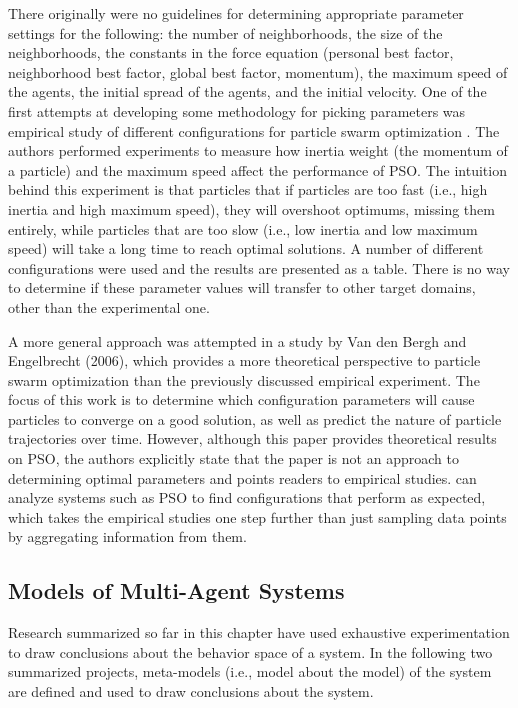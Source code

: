 There originally were no guidelines for determining appropriate parameter settings for the following: the number of neighborhoods, the size of the neighborhoods, the constants in the force equation (personal best factor, neighborhood best factor, global best factor, momentum), the maximum speed of the agents, the initial spread of the agents, and the initial velocity.
One of the first attempts at developing some methodology for picking parameters was empirical study of different configurations for particle swarm optimization \cite{shi1998parameter}.
The authors performed experiments to measure how inertia weight (the momentum of a particle) and the maximum speed affect the performance of PSO.
The intuition behind this experiment is that particles that if particles are too fast (i.e., high inertia and high maximum speed), they will overshoot optimums, missing them entirely, while particles that are too slow (i.e., low inertia and low maximum speed) will take a long time to reach optimal solutions.
A number of different configurations were used and the results are presented as a table.
There is no way to determine if these parameter values will transfer to other target domains, other than the experimental one.

A more general approach was attempted in a study by Van den Bergh and Engelbrecht (2006)\nocite{van2006study}, which provides a more theoretical perspective to particle swarm optimization than the previously discussed empirical experiment.
The focus of this work is to determine which configuration parameters will cause particles to converge on a good solution, as well as predict the nature of particle trajectories over time.
However, although this paper provides theoretical results on PSO, the authors explicitly state that the paper is not an approach to determining optimal parameters and points readers to empirical studies.
\fw can analyze systems such as PSO to find configurations that perform as expected, which takes the empirical studies one step further than just sampling data points by aggregating information from them.

\subsection{Models of Multi-Agent Systems}

Research summarized so far in this chapter have used exhaustive experimentation to draw conclusions about the behavior space of a system.
In the following two summarized projects, meta-models (i.e., model about the model) of the system are defined and used to draw conclusions about the system.

